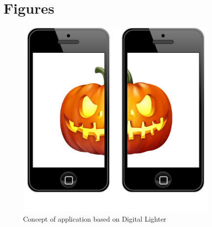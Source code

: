 


\chapter{Figures}
\begin{figure}[H]
	\centering
		\includegraphics[width=10cm]{images/extension.png}
	\caption{Concept of application based on Digital Lighter}
	\label{fig:extension}
\end{figure}
